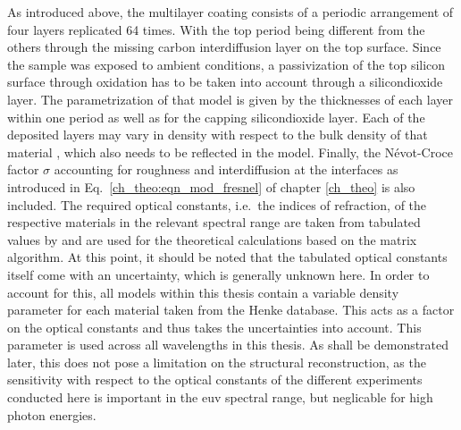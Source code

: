 As introduced above, the multilayer coating consists of a periodic arrangement of four layers replicated 64 times. With the top period being different from the others through the missing carbon interdiffusion layer on the top surface. Since the sample was exposed to ambient conditions, a passivization of the top silicon surface through oxidation has to be taken into account through a silicondioxide layer. The parametrization of that model is given by the thicknesses of each layer within one period as well as for the capping silicondioxide layer. Each of the deposited layers may vary in density with respect to the bulk density of that material \cite{braun_mo/si_2002}, which also needs to be reflected in the model. Finally, the N{\'e}vot-Croce factor $\sigma$ accounting for roughness and interdiffusion at the interfaces as introduced in Eq.~\eqref{ch_theo:eqn_mod_fresnel} of chapter \ref{ch_theo} is also included. The required optical constants, i.e.~the indices of refraction, of the respective materials in the relevant spectral range are taken from tabulated values by \textcite{henke_x-ray_1993} and are used for the theoretical calculations based on the matrix algorithm. At this point, it should be noted that the tabulated optical constants itself come with an uncertainty, which is generally unknown here. In order to account for this, all models within this thesis contain a variable density parameter for each material taken from the Henke database. This acts as a factor on the optical constants and thus takes the uncertainties into account. This parameter is used across all wavelengths in this thesis. As shall be demonstrated later, this does not pose a limitation on the structural reconstruction, as the sensitivity with respect to the optical constants of the different experiments conducted here is important in the \gls{euv} spectral range, but neglicable for high photon energies.

